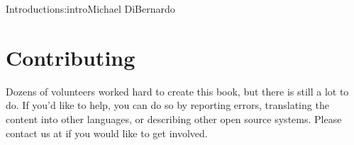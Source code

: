 \begin{aosachapter}{Introduction}{s:intro}{Michael DiBernardo}
\section*{Contributing}


Dozens of volunteers worked hard to create this book,
but there is still a lot to do.
If you'd like to help,
you can do so by reporting errors,
translating the content into other languages,
or describing other open source systems.
Please contact us at  if you would like to get involved.

\end{aosachapter}
